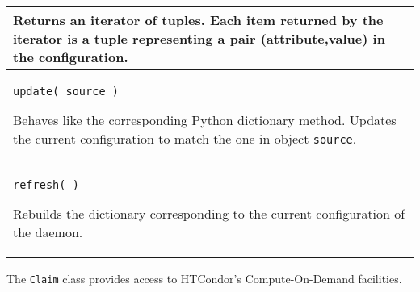\begin{flushleft}
\begin{longtable}{|p{16cm}|}
Returns an iterator of tuples. 
Each item returned by the iterator is a tuple representing a pair 
(attribute,value) in the configuration.
\\ \hline
\texttt{update( source )}

Behaves like the corresponding Python dictionary method.
Updates the current configuration to match the one in object 
\texttt{source}.
\\ \hline
\texttt{refresh( )}

Rebuilds the dictionary corresponding to the current
configuration of the daemon.
\\ \hline

\end{longtable}
\end{flushleft}

The \texttt{Claim} class provides access to HTCondor's
Compute-On-Demand facilities.

